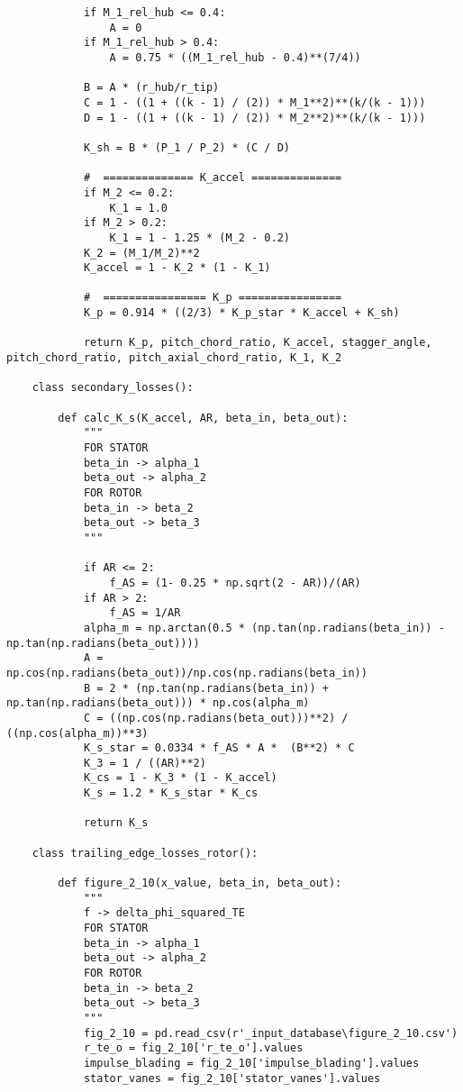 \begin{verbatim}
            if M_1_rel_hub <= 0.4:
                A = 0
            if M_1_rel_hub > 0.4:      
                A = 0.75 * ((M_1_rel_hub - 0.4)**(7/4))

            B = A * (r_hub/r_tip)
            C = 1 - ((1 + ((k - 1) / (2)) * M_1**2)**(k/(k - 1)))
            D = 1 - ((1 + ((k - 1) / (2)) * M_2**2)**(k/(k - 1)))

            K_sh = B * (P_1 / P_2) * (C / D)

            #  ============== K_accel ==============
            if M_2 <= 0.2:
                K_1 = 1.0
            if M_2 > 0.2:
                K_1 = 1 - 1.25 * (M_2 - 0.2)
            K_2 = (M_1/M_2)**2
            K_accel = 1 - K_2 * (1 - K_1)

            #  ================ K_p ================
            K_p = 0.914 * ((2/3) * K_p_star * K_accel + K_sh)

            return K_p, pitch_chord_ratio, K_accel, stagger_angle,  pitch_chord_ratio, pitch_axial_chord_ratio, K_1, K_2
        
    class secondary_losses():

        def calc_K_s(K_accel, AR, beta_in, beta_out):
            """
            FOR STATOR
            beta_in -> alpha_1
            beta_out -> alpha_2
            FOR ROTOR
            beta_in -> beta_2
            beta_out -> beta_3
            """

            if AR <= 2:
                f_AS = (1- 0.25 * np.sqrt(2 - AR))/(AR)
            if AR > 2:
                f_AS = 1/AR           
            alpha_m = np.arctan(0.5 * (np.tan(np.radians(beta_in)) - np.tan(np.radians(beta_out)))) 
            A = np.cos(np.radians(beta_out))/np.cos(np.radians(beta_in))  
            B = 2 * (np.tan(np.radians(beta_in)) + np.tan(np.radians(beta_out))) * np.cos(alpha_m)  
            C = ((np.cos(np.radians(beta_out)))**2) / ((np.cos(alpha_m))**3)   
            K_s_star = 0.0334 * f_AS * A *  (B**2) * C
            K_3 = 1 / ((AR)**2)
            K_cs = 1 - K_3 * (1 - K_accel)
            K_s = 1.2 * K_s_star * K_cs

            return K_s
        
    class trailing_edge_losses_rotor():

        def figure_2_10(x_value, beta_in, beta_out):
            """
            f -> delta_phi_squared_TE
            FOR STATOR
            beta_in -> alpha_1
            beta_out -> alpha_2
            FOR ROTOR
            beta_in -> beta_2
            beta_out -> beta_3
            """
            fig_2_10 = pd.read_csv(r'_input_database\figure_2_10.csv')
            r_te_o = fig_2_10['r_te_o'].values
            impulse_blading = fig_2_10['impulse_blading'].values
            stator_vanes = fig_2_10['stator_vanes'].values


\end{verbatim}
